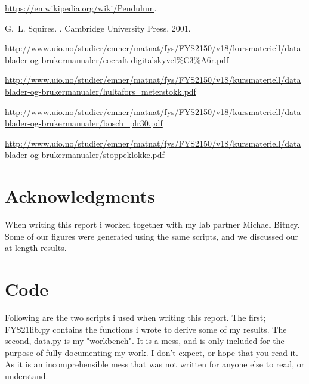 \documentclass[11pt,a4paper]{article}
\begin{document}
\begin{thebibliography}{1}

\url{https://en.wikipedia.org/wiki/Pendulum}.

G.~L. Squires.
.
\newblock Cambridge University Press, 2001.

\url{http://www.uio.no/studier/emner/matnat/fys/FYS2150/v18/kursmateriell/datablader-og-brukermanualer/cocraft-digitalskyvel%C3%A6r.pdf}

\url{http://www.uio.no/studier/emner/matnat/fys/FYS2150/v18/kursmateriell/datablader-og-brukermanualer/hultafors_meterstokk.pdf}

\url{http://www.uio.no/studier/emner/matnat/fys/FYS2150/v18/kursmateriell/datablader-og-brukermanualer/bosch_plr30.pdf}

\url{http://www.uio.no/studier/emner/matnat/fys/FYS2150/v18/kursmateriell/datablader-og-brukermanualer/stoppeklokke.pdf}

\end{thebibliography}

\section*{Acknowledgments}
  When writing this report i worked together with my lab partner Michael Bitney. Some of our figures were generated using the same scripts, and we discussed our at length results.

\section*{Code}
Following are the two scripts i used when writing this report. The first; FYS21lib.py contains the functions i wrote to derive some of my results. The second, data.py is my "workbench". It is a mess, and is only included for the purpose of fully documenting my work. I don't expect, or hope that you read it. As it is an incomprehensible mess that was not written for anyone else to read, or understand.


\end{document}
